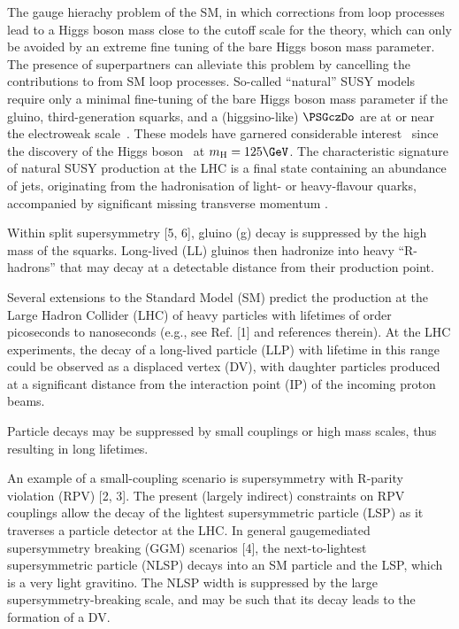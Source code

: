 The gauge hierachy problem of the SM, in which corrections from loop
processes lead to a Higgs boson mass \higgsmass close to the cutoff
scale for the theory, which can only be avoided by an extreme fine
tuning of the bare Higgs boson mass parameter. The presence of
superpartners can alleviate this problem by cancelling the
contributions to \higgsmass from SM loop processes. So-called
``natural'' SUSY models require only a minimal fine-tuning of the bare
Higgs boson mass parameter if the gluino, third-generation squarks,
and a (higgsino-like) $\PSGczDo$ are at or near the electroweak
scale~\cite{ref:barbierinsusy}. These models have garnered
considerable interest~\cite{Delgado:2012eu, Boehm:1999tr,
  Carena:2008mj, Grober:2014aha, Grober:2015fia, Boehm:1999bj,
  Balazs:2004bu, Martin:2007gf, Martin:2007hn} since the discovery of
the Higgs boson~\cite{ref:atlashiggsdiscovery, ref:cmshiggsdiscovery,
  ref:cmshiggsdiscoverylong} at $\higgsmass = 125\GeV$. The
characteristic signature of natural SUSY production at the LHC is a
final state containing an abundance of jets, originating from the
hadronisation of light- or heavy-flavour quarks, accompanied by
significant missing transverse momentum \ptvecmiss.


Within split supersymmetry [5, 6], gluino (g) decay is suppressed by
the high mass of the squarks. Long-lived (LL) gluinos then hadronize
into heavy ``R-hadrons'' that may decay at a detectable distance from
their production point.

Several extensions to the Standard Model (SM) predict the production
at the Large Hadron Collider (LHC) of heavy particles with lifetimes
of order picoseconds to nanoseconds (e.g., see Ref. [1] and references
therein). At the LHC experiments, the decay of a long-lived particle
(LLP) with lifetime in this range could be observed as a displaced
vertex (DV), with daughter particles produced at a significant
distance from the interaction point (IP) of the incoming proton
beams. 

Particle decays may be suppressed by small couplings or high mass
scales, thus resulting in long lifetimes. 

An example of a small-coupling scenario is supersymmetry with R-parity
violation (RPV) [2, 3]. The present (largely indirect) constraints on
RPV couplings allow the decay of the lightest supersymmetric particle
(LSP) as it traverses a particle detector at the LHC. In general
gaugemediated supersymmetry breaking (GGM) scenarios [4], the
next-to-lightest supersymmetric particle (NLSP) decays into an SM
particle and the LSP, which is a very light gravitino. The NLSP width
is suppressed by the large supersymmetry-breaking scale, and may be
such that its decay leads to the formation of a DV. 

